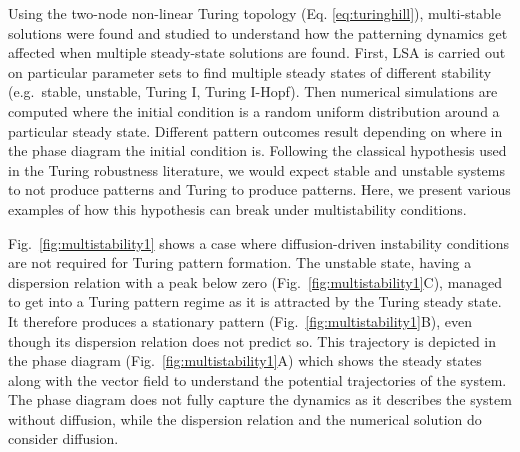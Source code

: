 Using the two-node non-linear Turing topology (Eq. \ref{eq:turinghill}), multi-stable solutions were found and studied to understand how the patterning dynamics get affected when multiple steady-state solutions are found.
First, LSA is carried out on particular parameter sets to find multiple steady states of different stability (e.g.~stable, unstable, Turing I, Turing I-Hopf).
Then numerical simulations are computed where the initial condition is a random uniform distribution around a particular steady state.
Different pattern outcomes result depending on where in the phase diagram the initial condition is.
Following the classical hypothesis used in the Turing robustness literature, we would expect stable and unstable systems to not produce patterns and Turing to produce patterns.
Here, we present various examples of how this hypothesis can break under multistability conditions.

Fig.~\ref{fig:multistability1} shows a case where diffusion-driven instability conditions are not required for Turing pattern formation.
The unstable state, having a dispersion relation with a peak below zero (Fig.~\ref{fig:multistability1}C), managed to get into a Turing pattern regime as it is attracted by the Turing steady state.
It therefore produces a stationary pattern (Fig.~\ref{fig:multistability1}B), even though its dispersion relation does not predict so.
This trajectory is depicted in the phase diagram (Fig.~\ref{fig:multistability1}A) which shows the steady states along with the vector field to understand the potential trajectories of the system.
The phase diagram does not fully capture the dynamics as it describes the system without diffusion, while the dispersion relation and the numerical solution do consider diffusion.

